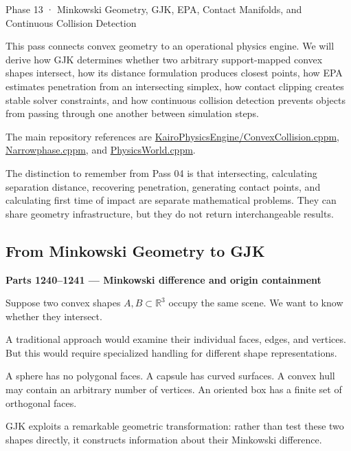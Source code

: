 Phase 13 · Minkowski Geometry, GJK, EPA, Contact Manifolds, and Continuous Collision Detection

This pass connects convex geometry to an operational physics engine. We will derive how GJK determines whether two arbitrary support-mapped convex shapes intersect, how its distance formulation produces closest points, how EPA estimates penetration from an intersecting simplex, how contact clipping creates stable solver constraints, and how continuous collision detection prevents objects from passing through one another between simulation steps.

The main repository references are \href{https://github.com/swayam8624/KairoPhysicsEngine/blob/main/ConvexCollision.cppm?utm_source=chatgpt.com}{KairoPhysicsEngine/ConvexCollision.cppm}, \href{https://github.com/swayam8624/KairoPhysicsEngine/blob/main/Narrowphase.cppm?utm_source=chatgpt.com}{Narrowphase.cppm}, and \href{https://github.com/swayam8624/KairoPhysicsEngine/blob/main/PhysicsWorld.cppm?utm_source=chatgpt.com}{PhysicsWorld.cppm}.

The distinction to remember from Pass 04 is that intersecting, calculating separation distance, recovering penetration, generating contact points, and calculating first time of impact are separate mathematical problems. They can share geometry infrastructure, but they do not return interchangeable results.

\subsection{From Minkowski Geometry to GJK}\label{04-visual-computing-ii-ch025-from-minkowski-geometry-to-gjk}

\textbf{Parts 1240--1241 --- Minkowski difference and origin containment}

Suppose two convex shapes \(A,B\subset\mathbb R^3\) occupy the same scene. We want to know whether they intersect.

A traditional approach would examine their individual faces, edges, and vertices. But this would require specialized handling for different shape representations.

A sphere has no polygonal faces. A capsule has curved surfaces. A convex hull may contain an arbitrary number of vertices. An oriented box has a finite set of orthogonal faces.

GJK exploits a remarkable geometric transformation: rather than test these two shapes directly, it constructs information about their Minkowski difference.

